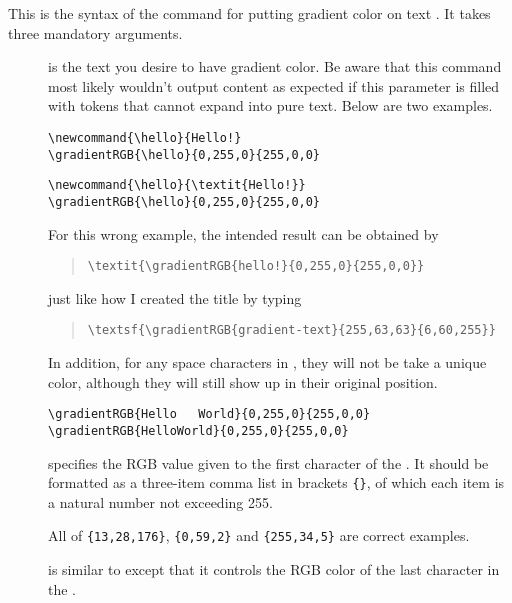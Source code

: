 \documentclass{ltxdoc}
\begin{document}
\begin{macro}{\gradientRGB}
This is the syntax of the command for putting gradient color on text . It takes three mandatory arguments.
\end{macro}
\begin{description}
\item[] is the text you desire to have gradient color. Be aware that this command most likely wouldn't output content as expected if this parameter is filled with tokens that cannot expand into pure text. Below are two examples.
\begin{tcolorbox}[sidebyside,coltitle=black,colbacktitle=white,lower separated=false,title=A correct usage,oversize,boxrule=0.5pt]
\begin{verbatim}
\newcommand{\hello}{Hello!}
\gradientRGB{\hello}{0,255,0}{255,0,0}
\end{verbatim}
\tcblower
\hfill{}
\end{tcolorbox}
\begin{tcolorbox}[sidebyside,coltitle=orange,colbacktitle=white,lower separated=false,title=\SmallCross~An incorrect usage,oversize,boxrule=0.5pt]
\begin{verbatim}
\newcommand{\hello}{\textit{Hello!}}
\gradientRGB{\hello}{0,255,0}{255,0,0}
\end{verbatim}
\tcblower
\hfill{}
\end{tcolorbox}
For this wrong example, the intended result can be obtained by
\begin{quote}
\verb|\textit{\gradientRGB{hello!}{0,255,0}{255,0,0}}|
\end{quote}
just like how I created the title by typing
\begin{quote}
\verb|\textsf{\gradientRGB{gradient-text}{255,63,63}{6,60,255}}|
\end{quote}

In addition, for any space characters in , they will not be take a unique color, although they will still show up in their original position.
\begin{tcolorbox}[coltitle=black,colbacktitle=white,lower separated=false,title=Example of space characters,oversize,boxrule=0.5pt]
\verb|\gradientRGB{Hello   World}{0,255,0}{255,0,0}|\hfill{}
\tcblower
\verb|\gradientRGB{HelloWorld}{0,255,0}{255,0,0}|\hfill{}
\end{tcolorbox}
\item[] specifies the RGB value given to the first character of the . It should be formatted as a three-item comma list in brackets \verb|{}|, of which each item is a natural number not exceeding 255.

All of \verb|{13,28,176}|, \verb|{0,59,2}| and \verb|{255,34,5}| are correct examples.
\item[] is similar to  except that it controls the RGB color of the last character in the .
\end{description}
\end{document}
